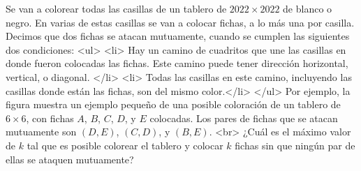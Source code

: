 Se van a colorear todas las casillas de un tablero de $2022\times 2022$ de blanco o negro. En varias de estas casillas se van a colocar fichas, a lo más una por casilla. Decimos que dos fichas se atacan mutuamente, cuando se cumplen las siguientes dos condiciones:
<ul>
<li> Hay un camino de cuadritos que une las casillas en donde fueron colocadas las fichas. Este camino puede tener dirección horizontal, vertical, o diagonal. </li>
<li> Todas las casillas en este camino, incluyendo las casillas donde están las fichas, son del mismo color.</li>
</ul>
Por ejemplo, la figura muestra un ejemplo pequeño de una posible coloración de un tablero de $6\times 6$, con fichas $A$, $B$, $C$, $D$, y $E$ colocadas. Los pares de fichas que se atacan mutuamente son $(D,E)$, $(C,D)$, y $(B,E)$. <br> 
¿Cuál es el máximo valor de $k$ tal que es posible colorear el tablero y colocar $k$ fichas sin que ningún par de ellas se ataquen mutuamente?